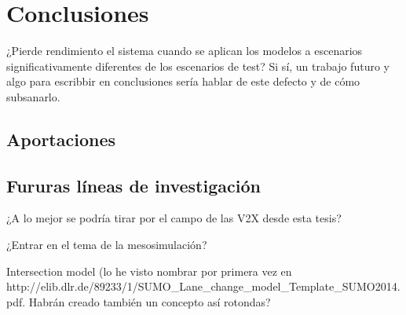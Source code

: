 \chapter{Conclusiones}
\label{ch:conclusions}

¿Pierde rendimiento el sistema cuando se aplican los modelos a escenarios significativamente diferentes de los escenarios de test? Si sí, un trabajo futuro y algo para escribbir en conclusiones sería hablar de este defecto y de cómo subsanarlo.

\section{Aportaciones}
\label{ch:conclusions:contributions}

\section{Fururas líneas de investigación}
\label{ch:conclusions:future-work}

¿A lo mejor se podría tirar por el campo de las V2X desde esta tesis?

¿Entrar en el tema de la mesosimulación?

Intersection model (lo he visto nombrar por primera vez en http://elib.dlr.de/89233/1/SUMO\_Lane\_change\_model\_Template\_SUMO2014.pdf. Habrán creado también un concepto así rotondas?